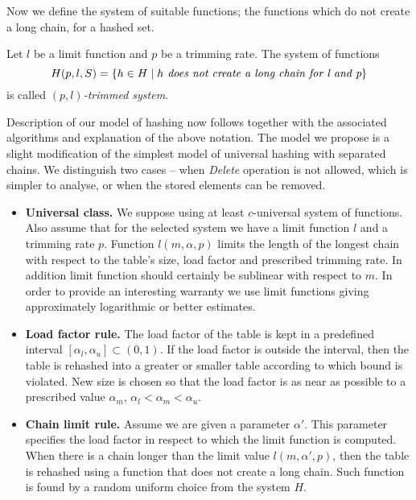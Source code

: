Now we define the system of suitable functions; the functions which do not create a long chain, for a hashed set.
\begin{definition}
Let $l$ be a limit function and $p$ be a trimming rate. The system of functions \[ H(p, l, S) = \{ h \in H \mid h \textit{ does not create a long chain for l and p} \} \] is called \emph{$(p, l)$-trimmed system}.
\end{definition}

Description of our model of hashing now follows together with the associated algorithms and explanation of the above notation. The model we propose is a slight modification of the simplest model of universal hashing with separated chains. We distinguish two cases -- when \emph{Delete} operation is not allowed, which is simpler to analyse, or when the stored elements can be removed.

\begin{itemize}
\item \textbf{Universal class.} We suppose using at least $c$-universal system of functions. Also assume that for the selected system we have a limit function $l$ and a trimming rate $p$. Function $l(m, \alpha, p)$ limits the length of the longest chain with respect to the table's size, load factor and prescribed trimming rate. In addition limit function should certainly be sublinear with respect to $m$. In order to provide an interesting warranty we use limit functions giving approximately logarithmic or better estimates.

\item \textbf{Load factor rule.} The load factor of the table is kept in a predefined interval $[\alpha_l, \alpha_u] \subset (0, 1)$. If the load factor is outside the interval, then the table is rehashed into a greater or smaller table according to which bound is violated. New size is chosen so that the load factor is as near as possible to a prescribed value $\alpha_m$, $\alpha_l < \alpha_m < \alpha_u$. 

\item \textbf{Chain limit rule.} Assume we are given a parameter $\alpha'$. This parameter specifies the load factor in respect to which the limit function is computed. When there is a chain longer than the limit value $l(m, \alpha', p)$, then the table is rehashed using a function that does not create a long chain. Such function is found by a random uniform choice from the system $H$.
\end{itemize}

